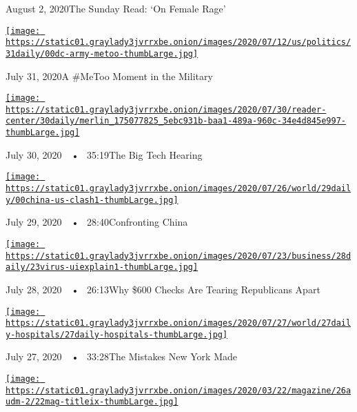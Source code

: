 August 2, 2020The Sunday Read: `On Female Rage'

\href{https://www.nytimes3xbfgragh.onion/2020/07/31/podcasts/the-daily/vanessa-guillen-military-metoo.html?action=click\&module=audio-series-bar\&region=header\&pgtype=Article}{\texttt{[image: https://static01.graylady3jvrrxbe.onion/images/2020/07/12/us/politics/31daily/00dc-army-metoo-thumbLarge.jpg]}}

July 31, 2020A \#MeToo Moment in the Military

\href{https://www.nytimes3xbfgragh.onion/2020/07/30/podcasts/the-daily/congress-facebook-amazon-google-apple.html?action=click\&module=audio-series-bar\&region=header\&pgtype=Article}{\texttt{[image: https://static01.graylady3jvrrxbe.onion/images/2020/07/30/reader-center/30daily/merlin\_175077825\_5ebc931b-baa1-489a-960c-34e4d845e997-thumbLarge.jpg]}}

July 30, 2020~~•~ 35:19The Big Tech Hearing

\href{https://www.nytimes3xbfgragh.onion/2020/07/29/podcasts/the-daily/china-trump-foreign-policy.html?action=click\&module=audio-series-bar\&region=header\&pgtype=Article}{\texttt{[image: https://static01.graylady3jvrrxbe.onion/images/2020/07/26/world/29daily/00china-us-clash1-thumbLarge.jpg]}}

July 29, 2020~~•~ 28:40Confronting China

\href{https://www.nytimes3xbfgragh.onion/2020/07/28/podcasts/the-daily/unemployment-benefits-coronavirus.html?action=click\&module=audio-series-bar\&region=header\&pgtype=Article}{\texttt{[image: https://static01.graylady3jvrrxbe.onion/images/2020/07/23/business/28daily/23virus-uiexplain1-thumbLarge.jpg]}}

July 28, 2020~~•~ 26:13Why \$600 Checks Are Tearing Republicans Apart

\href{https://www.nytimes3xbfgragh.onion/2020/07/27/podcasts/the-daily/new-york-hospitals-covid.html?action=click\&module=audio-series-bar\&region=header\&pgtype=Article}{\texttt{[image: https://static01.graylady3jvrrxbe.onion/images/2020/07/27/world/27daily-hospitals/27daily-hospitals-thumbLarge.jpg]}}

July 27, 2020~~•~ 33:28The Mistakes New York Made

\href{https://www.nytimes3xbfgragh.onion/2020/07/26/podcasts/the-daily/the-accusation-the-sunday-read.html?action=click\&module=audio-series-bar\&region=header\&pgtype=Article}{\texttt{[image: https://static01.graylady3jvrrxbe.onion/images/2020/03/22/magazine/26audm-2/22mag-titleix-thumbLarge.jpg]}}

